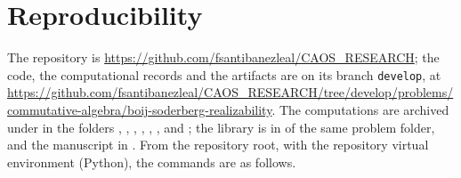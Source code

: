 \documentclass[11pt]{article}
\theoremstyle{definition}
\theoremstyle{remark}
\begin{document}
\FloatBarrier
\section{Reproducibility}
\label{sec:repro}
\begingroup\raggedright

The repository is \url{https://github.com/fsantibanezleal/CAOS_RESEARCH}; the code, the computational records and the artifacts are on its branch \texttt{develop}, at \url{https://github.com/fsantibanezleal/CAOS_RESEARCH/tree/develop/problems/commutative-algebra/boij-soderberg-realizability}. The computations are archived under  in the folders , , , , , ,  and ; the library is in  of the same problem folder, and the manuscript in . From the repository root, with the repository virtual environment (Python), the commands are as follows.
\end{document}
